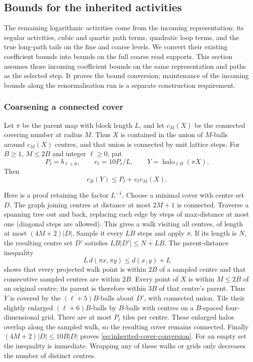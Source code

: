 \subsection{Bounds for the inherited activities}
\label{sec:inherited-activity-prices}
The remaining logarithmic activities come from the incoming
representation: its regular activities, cubic and quartic path
terms, quadratic loop terms, and the true long-path tails on the
fine and coarse levels. We convert their existing coefficient
bounds into bounds on the full coarse read supports. This section
assumes those incoming coefficient bounds on the same representation
and paths as the selected step. It proves the bound conversion;
maintenance of the incoming bounds along the renormalisation run
is a separate construction requirement.

\subsubsection{Coarsening a connected cover}
Let $\pi$ be the parent map with block length $L$, and let
$c_M(X)$ be the connected covering number at radius $M$. Thus
$X$ is contained in the union of $M$-balls around $c_M(X)$
centres, and that union is connected by unit lattice steps.
For $B\ge1$, $M\le2B$ and integer $\ell\ge0$, put
\[
 P_\ell=b_{\ell+6},\qquad v_\ell=10P_\ell/L,
 \qquad Y=\operatorname{halo}_{\ell B}(\pi X).
\]
Then
\begin{equation}\label{eq:inherited-cover-conversion}
 c_B(Y)\le P_\ell+v_\ell c_M(X).
\end{equation}

Here is a proof retaining the factor $L^{-1}$. Choose a minimal
cover with centre set $D$. The graph joining centres at distance
at most $2M+1$ is connected. Traverse a spanning tree out and
back, replacing each edge by steps of max-distance at most one
(diagonal steps are allowed). This gives a walk
visiting all centres, of length at most $(4M+2)|D|$.
Sample it every $LB$ steps and apply $\pi$. If its length is $N$,
the resulting centre set $D'$ satisfies
$LB|D'|\le N+LB$. The parent-distance inequality
\[
 L\,d(\pi x,\pi y)\le d(x,y)+L
\]
shows that every projected walk point is within $2B$ of a
sampled centre and that consecutive sampled centres are within
$2B$. Every point of $X$ is within $M\le2B$ of an original
centre; its parent is therefore within $3B$ of that centre's
parent. Thus $Y$ is covered by the $(\ell+5)B$-balls about
$D'$, with connected union. Tile their slightly enlarged
$(\ell+6)B$-balls by $B$-balls with centres on a $B$-spaced
four-dimensional grid. There are at most $P_\ell$ tiles per
centre. These enlarged halos overlap along the sampled walk,
so the resulting cover remains connected. Finally
$(4M+2)|D|\le10B|D|$ proves
\eqref{eq:inherited-cover-conversion}. For an empty set the
inequality is immediate. Wrapping any of these walks or grids
only decreases the number of distinct centres.

